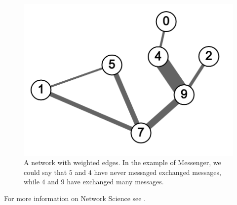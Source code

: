 \begin{figure}[H]
  \centering
  \includegraphics[scale=.25]{img/weighted_sample.png}
  \caption{A network with weighted edges. In the example of Messenger,
          we could say that $5$ and $4$ have never messaged exchanged messages,
          while $4$ and $9$ have exchanged many messages.}
  \label{fig:net_weight}
\end{figure}
For more information on Network Science see \cite{menczer2020first}.